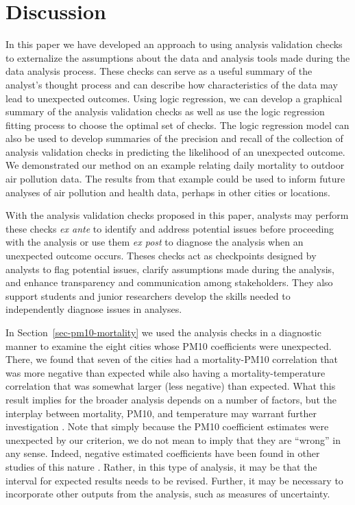 \documentclass[
  12pt,
]{interact}
\begin{document}
\section{Discussion}\label{sec-discussion}

In this paper we have developed an approach to using analysis validation
checks to externalize the assumptions about the data and analysis tools
made during the data analysis process. These checks can serve as a
useful summary of the analyst's thought process and can describe how
characteristics of the data may lead to unexpected outcomes. Using logic
regression, we can develop a graphical summary of the analysis
validation checks as well as use the logic regression fitting process to
choose the optimal set of checks. The logic regression model can also be
used to develop summaries of the precision and recall of the collection
of analysis validation checks in predicting the likelihood of an
unexpected outcome. We demonstrated our method on an example relating
daily mortality to outdoor air pollution data. The results from that
example could be used to inform future analyses of air pollution and
health data, perhaps in other cities or locations.

With the analysis validation checks proposed in this paper, analysts may
perform these checks \emph{ex ante} to identify and address potential
issues before proceeding with the analysis or use them \emph{ex post} to
diagnose the analysis when an unexpected outcome occurs. Theses checks
act as checkpoints designed by analysts to flag potential issues,
clarify assumptions made during the analysis, and enhance transparency
and communication among stakeholders. They also support students and
junior researchers develop the skills needed to independently diagnose
issues in analyses.

In Section~\ref{sec-pm10-mortality} we used the analysis checks in a
diagnostic manner to examine the eight cities whose PM10 coefficients
were unexpected. There, we found that seven of the cities had a
mortality-PM10 correlation that was more negative than expected while
also having a mortality-temperature correlation that was somewhat larger
(less negative) than expected. What this result implies for the broader
analysis depends on a number of factors, but the interplay between
mortality, PM10, and temperature may warrant further investigation
\citep[see e.g.][]{welty2005acute}. Note that simply because the PM10
coefficient estimates were unexpected by our criterion, we do not mean
to imply that they are ``wrong'' in any sense. Indeed, negative
estimated coefficients have been found in other studies of this nature
\citep{bell2004ozone}. Rather, in this type of analysis, it may be that
the interval for expected results needs to be revised. Further, it may
be necessary to incorporate other outputs from the analysis, such as
measures of uncertainty.
\end{document}
